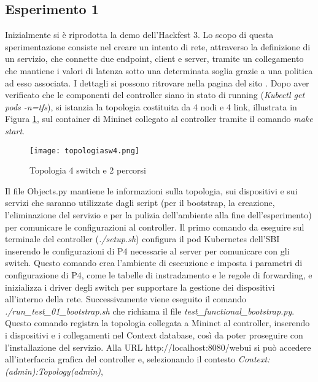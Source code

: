 \subsection{Esperimento 1}
Inizialmente si è riprodotta la demo dell'Hackfest 3.
Lo scopo di questa sperimentazione consiste nel creare un intento di rete, attraverso la definizione di un servizio, 
che connette due endpoint, client e server, tramite un collegamento che mantiene i valori di latenza sotto 
una determinata soglia grazie a una politica ad esso associata.
I dettagli si possono ritrovare nella pagina del sito \cite{hackfest}.
\newline Dopo aver verificato che le componenti del controller siano in stato di running (\textit{Kubectl get pods -n=tfs}),
si istanzia la topologia \cite{topo4} costituita da 4 nodi e 4 link, illustrata in Figura \ref{fig:top4}, sul container di Mininet collegato al controller
tramite il comando \textit{make start}.
\begin{figure}[h]
    \centering
    \texttt{[image: topologiasw4.png]}
    \caption{Topologia 4 switch e 2 percorsi}
    \label{fig:top4}
\end{figure}
\newline Il file Objects.py mantiene le informazioni sulla topologia, sui dispositivi e sui servizi
che saranno utilizzate dagli script (per il bootstrap, la creazione, l'eliminazione del servizio e per la pulizia dell'ambiente alla fine dell'esperimento) 
per comunicare le configurazioni al controller.
\newline Il primo comando da eseguire sul terminale del controller (\textit{./setup.sh}) configura il pod Kubernetes dell'SBI
inserendo le configurazioni di P4 necessarie al server per comunicare con gli switch.
Questo comando crea l'ambiente di esecuzione e imposta i parametri di configurazione di P4, come le tabelle di instradamento e le regole di forwarding, e 
inizializza i driver degli switch per supportare la gestione dei dispositivi all'interno della rete. 
\newline Successivamente viene eseguito il comando \textit{./run\_test\_01\_bootstrap.sh} che richiama il file \textit{test\_functional\_bootstrap.py}.
Questo comando registra la topologia collegata a Mininet al controller, inserendo i dispositivi e i collegamenti nel Context database, così da poter proseguire con l'installazione del servizio.
\newline Alla URL http://localhost:8080/webui si può accedere all'interfaccia grafica del controller e, selezionando il contesto \textit{Context:(admin):Topology(admin)},
